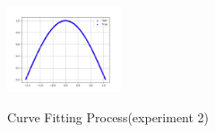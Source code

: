 \documentclass[12pt]{article}
\theoremstyle{remark}
\begin{document}
\begin{figure}[h]
{													\includegraphics[width=0.3\textwidth]{../width=100loss=mean_absolute_errorini=0.1rep=2/predict_plot_2500.png}}
												\caption{Curve Fitting Process(experiment 2)}
											\end{figure}
											\newpage
							
\end{document}
